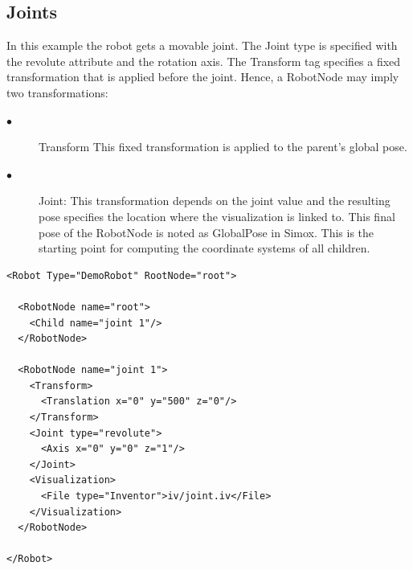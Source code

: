 \subsection{Joints}
\par
In this example the robot gets a movable joint. The Joint type is specified with the revolute attribute and the rotation axis. The Transform tag specifies a fixed transformation that is applied before the joint. Hence, a RobotNode may imply two transformations:
\begin{description}
   \item[$\bullet$] Transform This fixed transformation is applied to the parent's global pose.
 \item[$\bullet$]Joint: This transformation depends on the joint value and the resulting pose specifies the location where the visualization is linked to. This final pose of the RobotNode is noted as GlobalPose in Simox. This is the starting point for computing the coordinate systems of all children. 
\end{description}
\par
\begin{lstlisting}
<Robot Type="DemoRobot" RootNode="root">

  <RobotNode name="root">
    <Child name="joint 1"/>
  </RobotNode>

  <RobotNode name="joint 1">
    <Transform>
      <Translation x="0" y="500" z="0"/>
    </Transform>
    <Joint type="revolute">
      <Axis x="0" y="0" z="1"/>
    </Joint>
    <Visualization>
      <File type="Inventor">iv/joint.iv</File>
    </Visualization>
  </RobotNode>

</Robot>
\end{lstlisting}

